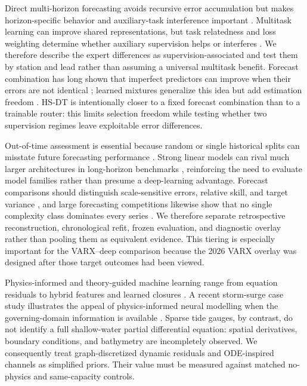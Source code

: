 \documentclass[final,5p,times,twocolumn]{elsarticle}
\begin{document}
Direct multi-horizon forecasting avoids recursive error accumulation but makes horizon-specific behavior and auxiliary-task interference important \citep{lim2021tft}. Multitask learning can improve shared representations, but task relatedness and loss weighting determine whether auxiliary supervision helps or interferes \citep{caruana1997multitask,kendall2018multitask}. We therefore describe the expert differences as supervision-associated and test them by station and lead rather than assuming a universal multitask benefit. Forecast combination has long shown that imperfect predictors can improve when their errors are not identical \citep{bates1969combination,clemen1989combining}; learned mixtures generalize this idea but add estimation freedom \citep{jacobs1991moe,monteromanso2020fforma}. HS-DT is intentionally closer to a fixed forecast combination than to a trainable router: this limits selection freedom while testing whether two supervision regimes leave exploitable error differences.

Out-of-time assessment is essential because random or single historical splits can misstate future forecasting performance \citep{cerqueira2020evaluation,hewamalage2023pitfalls}. Strong linear models can rival much larger architectures in long-horizon benchmarks \citep{zeng2023dlinear}, reinforcing the need to evaluate model families rather than presume a deep-learning advantage. Forecast comparisons should distinguish scale-sensitive errors, relative skill, and target variance \citep{hyndman2006accuracy}, and large forecasting competitions likewise show that no single complexity class dominates every series \citep{makridakis2018m4}. We therefore separate retrospective reconstruction, chronological refit, frozen evaluation, and diagnostic overlay rather than pooling them as equivalent evidence. This tiering is especially important for the VARX--deep comparison because the 2026 VARX overlay was designed after those target outcomes had been viewed.

Physics-informed and theory-guided machine learning range from equation residuals to hybrid features and learned closures \citep{karpatne2017theory,reichstein2019earth,karniadakis2021piml,willard2022scientific}. A recent storm-surge case study illustrates the appeal of physics-informed neural modelling when the governing-domain information is available \citep{zhu2025pinnsurge}. Sparse tide gauges, by contrast, do not identify a full shallow-water partial differential equation: spatial derivatives, boundary conditions, and bathymetry are incompletely observed. We consequently treat graph-discretized dynamic residuals and ODE-inspired channels as simplified priors. Their value must be measured against matched no-physics and same-capacity controls.
\end{document}
